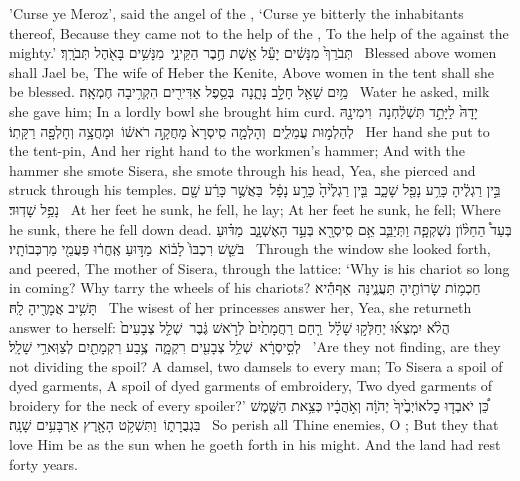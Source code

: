 {’Curse ye Meroz’, said the angel of the \lord, ‘Curse ye bitterly the inhabitants thereof, Because they came not to the help of the \lord, To the help of the \lord\space against the mighty.’}
{תְּבֹרַךְ֙ מִנָּשִׁ֔ים יָעֵ֕ל אֵ֖שֶׁת חֶ֣בֶר הַקֵּינִ֑י \setuma  מִנָּשִׁ֥ים בָּאֹ֖הֶל תְּבֹרָֽךְ׃ \setuma }
{Blessed above women shall Jael be, The wife of Heber the Kenite, Above women in the tent shall she be blessed.}
{מַ֥יִם שָׁאַ֖ל חָלָ֣ב נָתָ֑נָה \setuma  בְּסֵ֥פֶל אַדִּירִ֖ים הִקְרִ֥יבָה חֶמְאָֽה׃ \setuma }
{Water he asked, milk she gave him; In a lordly bowl she brought him curd.}
{יָדָהּ֙ לַיָּתֵ֣ד תִּשְׁלַ֔חְנָה \setuma  וִימִינָ֖הּ לְהַלְמ֣וּת עֲמֵלִ֑ים \setuma  וְהָלְמָ֤ה סִֽיסְרָא֙ מָחֲקָ֣ה רֹאשׁ֔וֹ \setuma  וּמָחֲצָ֥ה וְחָלְפָ֖ה רַקָּתֽוֹ׃ \setuma }
{Her hand she put to the tent-pin, And her right hand to the workmen’s hammer; And with the hammer she smote Sisera, she smote through his head, Yea, she pierced and struck through his temples.}
{בֵּ֣ין רַגְלֶ֔יהָ כָּרַ֥ע נָפַ֖ל שָׁכָ֑ב \setuma  בֵּ֤ין רַגְלֶ֙יהָ֙ כָּרַ֣ע נָפָ֔ל \setuma  בַּאֲשֶׁ֣ר כָּרַ֔ע שָׁ֖ם נָפַ֥ל שָׁדֽוּד׃ \setuma }
{At her feet he sunk, he fell, he lay; At her feet he sunk, he fell; Where he sunk, there he fell down dead.}
{בְּעַד֩ הַחַלּ֨וֹן נִשְׁקְפָ֧ה וַתְּיַבֵּ֛ב אֵ֥ם סִֽיסְרָ֖א בְּעַ֣ד הָאֶשְׁנָ֑ב \setuma  מַדּ֗וּעַ בֹּשֵׁ֤שׁ רִכְבּוֹ֙ לָב֔וֹא \setuma  מַדּ֣וּעַ אֶֽחֱר֔וּ פַּעֲמֵ֖י מַרְכְּבוֹתָֽיו׃ \setuma }
{Through the window she looked forth, and peered, The mother of Sisera, through the lattice: ‘Why is his chariot so long in coming? Why tarry the wheels of his chariots?}
{חַכְמ֥וֹת שָׂרוֹתֶ֖יהָ תַּעֲנֶ֑ינָּה \setuma  אַף\maqqaf הִ֕יא תָּשִׁ֥יב אֲמָרֶ֖יהָ לָֽהּ׃ \setuma }
{The wisest of her princesses answer her, Yea, she returneth answer to herself:}
{הֲלֹ֨א יִמְצְא֜וּ יְחַלְּק֣וּ שָׁלָ֗ל \setuma  רַ֤חַם רַחֲמָתַ֙יִם֙ לְרֹ֣אשׁ גֶּ֔בֶר \setuma  שְׁלַ֤ל צְבָעִים֙ לְסִ֣יסְרָ֔א \setuma  שְׁלַ֥ל צְבָעִ֖ים רִקְמָ֑ה \setuma  צֶ֥בַע רִקְמָתַ֖יִם לְצַוְּארֵ֥י שָׁלָֽל׃ \setuma }
{’Are they not finding, are they not dividing the spoil? A damsel, two damsels to every man; To Sisera a spoil of dyed garments, A spoil of dyed garments of embroidery, Two dyed garments of broidery for the neck of every spoiler?’}
{כֵּ֠ן יֹאבְד֤וּ כׇל\maqqaf אוֹיְבֶ֙יךָ֙ יְהֹוָ֔ה וְאֹ֣הֲבָ֔יו כְּצֵ֥את הַשֶּׁ֖מֶשׁ בִּגְבֻרָת֑וֹ \setuma  וַתִּשְׁקֹ֥ט הָאָ֖רֶץ אַרְבָּעִ֥ים שָׁנָֽה׃ \petucha }
{So perish all Thine enemies, O \lord; But they that love Him be as the sun when he goeth forth in his might. And the land had rest forty years.}
